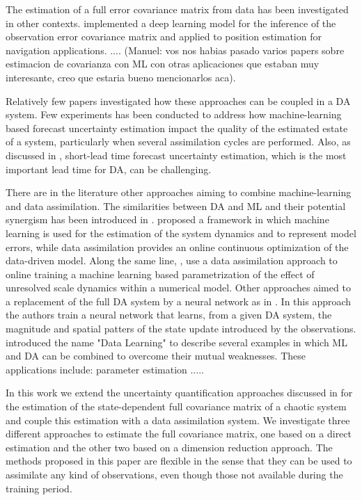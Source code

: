 \documentclass[num-refs]{wiley-article}
\begin{document}
The estimation of a full error covariance matrix from data has been investigated in other contexts. \cite{Liuetal2018} implemented a deep learning model for the inference of the observation error covariance matrix and applied to position estimation for navigation applications. 
.... (Manuel: vos nos habias pasado varios papers sobre estimacion de covarianza con ML con otras aplicaciones que estaban muy interesante, creo que estaria bueno mencionarlos aca).


Relatively few papers investigated how these approaches can be coupled in a DA system. Few experiments has been conducted to address how machine-learning based forecast uncertainty estimation impact the quality of the estimated estate of a system, particularly when several assimilation cycles are performed. Also, as discussed in \cite{saccoetal2022}, short-lead time forecast uncertainty estimation, which is the most important lead time for DA, can be challenging. %

There are in the literature other approaches aiming to combine machine-learning and data assimilation. The similarities between DA and ML and their potential synergism has been introduced in \cite{hesiehandtang1998}.  \cite{farchietal2021,farchietal2022,boquetetal2019,brajardetal2020} proposed a framework in which machine learning is used for the estimation of the system dynamics and to represent model errors, while data assimilation provides an online continuous optimization of the data-driven model. Along the same line, \cite{brajard2021, farchietal2021b}, use a data assimilation approach to online training a machine learning based parametrization of the effect of unresolved scale dynamics within a numerical model. 
Other approaches aimed to a replacement of the full DA system by a neural network as in \cite{Harteretal2008}. In this approach the authors train a neural network that learns, from a given DA system, the magnitude and spatial patters of the state update introduced by the observations. 
\cite{buizzaetal2021} introduced the name "Data Learning" to describe several examples in which ML and DA can be combined to overcome their mutual weaknesses. These applications include: parameter estimation ..... 

In this work we extend the uncertainty quantification approaches discussed in \cite{saccoetal2022} for the estimation of the state-dependent full covariance matrix of a chaotic system and couple this estimation with a data assimilation system. We investigate three different approaches to estimate the full covariance matrix, one based on a direct estimation and the other two based on a dimension reduction approach. The methods proposed in this paper are flexible in the sense that they can be used to assimilate any kind of observations, even though those not available during the training period.   
\end{document}
